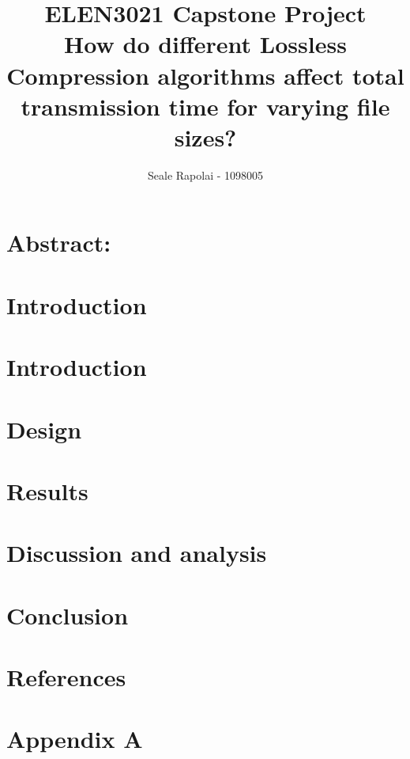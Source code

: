 \documentclass[12pt]{article}
\begin{document}
	\title{ELEN3021 Capstone Project
			\\How do different Lossless Compression algorithms affect total transmission time for varying file sizes?}
	\author{Seale Rapolai - 1098005}
	\maketitle
	
	\section{Abstract:}
		\begin{flushleft}
		
		\end{flushleft}
	\clearpage
	
	\section{Introduction}
		\begin{flushleft}
		
		\end{flushleft}
	
	\section{Introduction}
	
	\section{Design}
	
	\section{Results}
	
	\section{Discussion and analysis}
	
	\section{Conclusion}
		\begin{flushleft}
		
		\end{flushleft}

	\section{References}
	
	\clearpage
	\section{Appendix A}	
	
\end{document}
